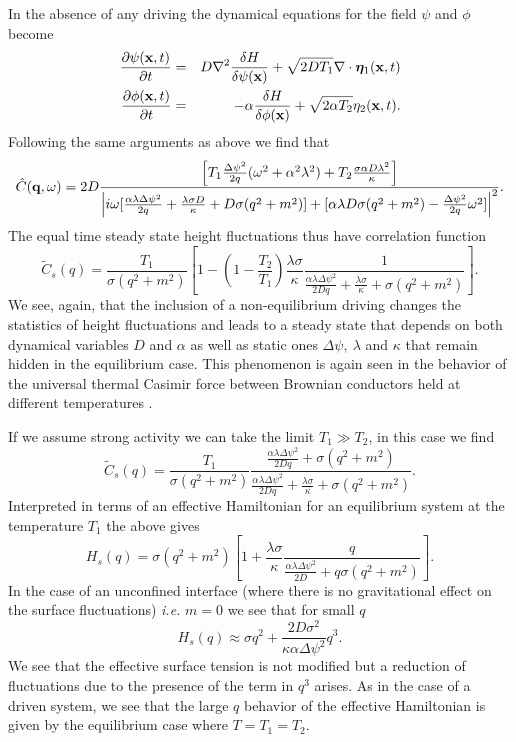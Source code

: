 In the absence of any driving the dynamical equations for the field $\psi$ and $\phi$ become 
\begin{eqnarray}
\frac{\partial \psi({\bf x},t)}{\partial t} &=& D\nabla^2\frac{\delta H}{\delta \psi({\bf x})}+ \sqrt{2D T_1}\nabla \cdot {\bm \eta}_1({\bf x},t) \\
\frac{\partial \phi({\bf x},t)}{\partial t} &=& -\alpha\frac{\delta H}{\delta \phi({\bf x})}+ \sqrt{2\alpha T_2}{ \eta}_2({\bf x},t).
\end{eqnarray}
Following the same arguments as above we find that
\begin{equation}
\hat C({\bf q},\omega)  = 2D \frac{\left[ T_1\frac{\Delta\psi^2}{2q}(\omega^2+\alpha^2 \lambda^2) + T_2\frac{\sigma\alpha D\lambda^2}{\kappa}\right]}{\left|i\omega[\frac{\alpha\lambda\Delta\psi^2}{2 q} +  \frac{\lambda \sigma D}{\kappa} + D\sigma(q^2+m^2)]
+[\alpha\lambda D\sigma(q^2+m^2) -\frac{\Delta\psi^2}{2q}\omega^2]\right|^2}.
\end{equation}
The equal time steady state height fluctuations thus have correlation function
\begin{equation}
\tilde C_s(q) = \frac{T_1}{\sigma (q^2 + m^2)}\left[ 1 -(1-\frac{T_2}{T_1})\frac{\lambda\sigma } {\kappa }\frac{1}{\frac{\alpha\lambda \Delta \psi^2}{2Dq}+ \frac{\lambda\sigma }{\kappa} + \sigma(q^2+m^2)}\right].
\end{equation}
We see, again, that the inclusion of a non-equilibrium driving changes the statistics of height fluctuations and leads to a steady state that depends on both dynamical variables
$D$ and $\alpha$ as well as static ones $\Delta\psi,\ \lambda$ and $\kappa$ that remain hidden in the equilibrium case. This phenomenon is again seen in the behavior of the universal thermal  Casimir force between Brownian conductors held at different temperatures \cite{lu2015}.

If we assume strong activity we can take the limit $T_1\gg T_2$, in this case we find
\begin{equation}
\tilde C_s(q) = \frac{T_1}{\sigma (q^2 + m^2)}\frac{\frac{\alpha\lambda \Delta \psi^2}{2Dq}+
\sigma(q^2+m^2)}{\frac{\alpha\lambda \Delta \psi^2}{2Dq}+ \frac{\lambda\sigma }{\kappa} + \sigma(q^2+m^2)}.
\end{equation}
Interpreted in terms of an effective Hamiltonian for an equilibrium system at the temperature $T_1$ the above gives
\begin{equation}
H_s(q) = \sigma (q^2 + m^2)\left[1+\frac{\lambda\sigma }{\kappa}\frac{q}{\frac{\alpha\lambda \Delta \psi^2}{2D}+
q\sigma(q^2+m^2)}\right].
\end{equation}
In the case of an unconfined interface (where there is no gravitational effect
on the surface fluctuations) {\em i.e.} $m=0$ we see that for small $q$
\begin{equation}
H_s(q) \approx \sigma q^2 +\frac{2D\sigma^2 }{\kappa\alpha \Delta\psi^2}q^3 .
\end{equation}
We see that the effective surface tension is not modified but a reduction of fluctuations due to the presence of the term in $q^3$ arises.  As in the case of a driven system, we see that the large $q$ behavior of the effective Hamiltonian is given by the equilibrium case where $T=T_1=T_2$. 

